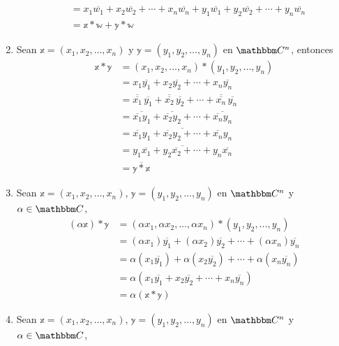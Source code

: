 \begin{example}
\begin{enumerate}[label=\roman*)]
\begin{align*}
            & = x_1\overline{w_1} + x_2\overline{w_2} + \cdots + x_n\overline{w_n} + y_1\overline{w_1} + y_2\overline{w_2} + \cdots + y_n\overline{w_n} \\
            & = \mathbb{x} * \mathbb{w} + \mathbb{y} * \mathbb{w}
        \end{align*}
        \item Sean $\mathbb{x} = (x_1, x_2, \dots, x_n)$ y $\mathbb{y} = (y_1, y_2, \dots, y_n)$ en $\CC[n]$, entonces
        \begin{align*}
            \mathbb{x} * \mathbb{y} & = (x_1, x_2, \dots, x_n) * (y_1, y_2, \dots, y_n) \\
            & = x_1\overline{y_1} + x_2\overline{y_2} + \cdots + x_n\overline{y_n} \\
            & = \overline{\overline{x_1}} \, \overline{y_1} + \overline{\overline{x_2}} \, \overline{y_2} + \cdots + \overline{\overline{x_n}} \, \overline{y_n} \\
            & = \overline{\overline{x_1}y_1} + \overline{\overline{x_2}y_2} + \cdots + \overline{\overline{x_n}y_n} \\
            & = \overline{\overline{x_1}y_1 + \overline{x_2}y_2 + \cdots + \overline{x_n}y_n} \\
            & = \overline{y_1\overline{x_1} + y_2\overline{x_2} + \cdots + y_n\overline{x_n}} \\
            & = \overline{\mathbb{y} * \mathbb{x}}
        \end{align*}
        \item Sean $\mathbb{x} = (x_1, x_2, \dots, x_n)$, $\mathbb{y} = (y_1, y_2, \dots, y_n)$ en $\CC[n]$ y $\alpha \in \CC$,
        \begin{align*}
            (\alpha \mathbb{x}) * \mathbb{y} & = (\alpha x_1, \alpha x_2, \dots, \alpha x_n) * (y_1, y_2, \dots, y_n) \\
            & = (\alpha x_1)\overline{y_1} + (\alpha x_2)\overline{y_2} + \cdots + (\alpha x_n)\overline{y_n} \\
            & = \alpha (x_1\overline{y_1}) + \alpha (x_2\overline{y_2}) + \cdots + \alpha (x_n\overline{y_n}) \\
            & = \alpha \left( x_1\overline{y_1} + x_2\overline{y_2} + \cdots + x_n\overline{y_n} \right) \\
            & = \alpha (\mathbb{x} * \mathbb{y})
        \end{align*}
        \item Sean $\mathbb{x} = (x_1, x_2, \dots, x_n)$, $\mathbb{y} = (y_1, y_2, \dots, y_n)$ en $\CC[n]$ y $\alpha \in \CC$,

\end{enumerate}
\end{example}
